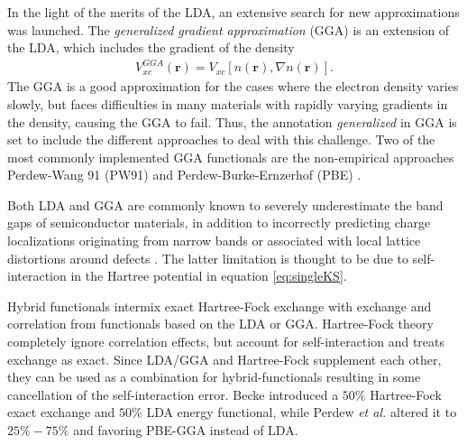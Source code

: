 In the light of the merits of the LDA, an extensive search for new approximations was launched. The \textit{generalized gradient approximation} (GGA) is an extension of the LDA, which includes the gradient of the density
\begin{align}
  V_{xc}^{GGA}(\textbf{r}) = V_{xc}\left[ n(\textbf{r}), \nabla n (\textbf{r})\right].
\end{align}
The GGA is a good approximation for the cases where the electron density varies slowly, but faces difficulties in many materials with rapidly varying gradients in the density, causing the GGA to fail. Thus, the annotation \textit{generalized} in GGA is set to include the different approaches to deal with this challenge. Two of the most commonly implemented GGA functionals are the non-empirical approaches Perdew-Wang 91 (PW91) \cite{Perdew1992} and Perdew-Burke-Ernzerhof (PBE) \cite{Perdew1996}.

Both LDA and GGA are commonly known to severely underestimate the band gaps of semiconductor materials, in addition to incorrectly predicting charge localizations originating from narrow bands or associated with local lattice distortions around defects \cite{Freysoldt2014}. The latter limitation is thought to be due to self-interaction in the Hartree potential in equation \ref{eq:singleKS}.

Hybrid functionals intermix exact Hartree-Fock exchange with exchange and correlation from functionals based on the LDA or GGA. Hartree-Fock theory completely ignore correlation effects, but account for self-interaction and treats exchange as exact. Since LDA/GGA and Hartree-Fock supplement each other, they can be used as a combination for hybrid-functionals resulting in some cancellation of the self-interaction error. Becke \cite{Becke1993} introduced a $50\%$ Hartree-Fock exact exchange and
$50\%$ LDA energy functional, while Perdew \textit{et al.} \cite{Perdew1996a} altered it to $25\%-75\%$ and favoring PBE-GGA instead of LDA.


